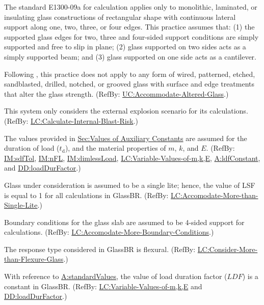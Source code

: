 \documentclass[12pt]{article}
\begin{document}
\begin{description}[font=\normalfont]
\item[glassType:\phantomsection\label{assumpGT}]{The standard E1300-09a for calculation applies only to monolithic, laminated, or insulating glass constructions of rectangular shape with continuous lateral support along one, two, three, or four edges. This practice assumes that: (1) the supported glass edges for two, three and four-sided support conditions are simply supported and free to slip in plane; (2) glass supported on two sides acts as a simply supported beam; and (3) glass supported on one side acts as a cantilever.}
\item[glassCondition:\phantomsection\label{assumpGC}]{Following \cite[(pg. 1)]{astm2009}, this practice does not apply to any form of wired, patterned, etched, sandblasted, drilled, notched, or grooved glass with surface and edge treatments that alter the glass strength. (RefBy: \hyperref[accAlteredGlass]{UC:Accommodate-Altered-Glass}.)}
\item[explainScenario:\phantomsection\label{assumpES}]{This system only considers the external explosion scenario for its calculations. (RefBy: \hyperref[calcInternalBlastRisk]{LC:Calculate-Internal-Blast-Risk}.)}
\item[standardValues:\phantomsection\label{assumpSV}]{The values provided in \hyperref[Sec:AuxConstants]{Sec:Values of Auxiliary Constants} are assumed for the duration of load (${t_{\text{d}}}$), and the material properties of $m$, $k$, and $E$. (RefBy: \hyperref[IM:sdfTol]{IM:sdfTol}, \hyperref[IM:nFL]{IM:nFL}, \hyperref[IM:dimlessLoad]{IM:dimlessLoad}, \hyperref[varValsOfmkE]{LC:Variable-Values-of-m,k,E}, \hyperref[assumpLDFC]{A:ldfConstant}, and \hyperref[DD:loadDurFactor]{DD:loadDurFactor}.)}
\item[glassLite:\phantomsection\label{assumpGL}]{Glass under consideration is assumed to be a single lite; hence, the value of LSF is equal to 1 for all calculations in GlassBR. (RefBy: \hyperref[accMoreThanSingleLite]{LC:Accomodate-More-than-Single-Lite}.)}
\item[boundaryConditions:\phantomsection\label{assumpBC}]{Boundary conditions for the glass slab are assumed to be 4-sided support for calculations. (RefBy: \hyperref[accMoreBoundaryConditions]{LC:Accomodate-More-Boundary-Conditions}.)}
\item[responseType:\phantomsection\label{assumpRT}]{The response type considered in GlassBR is flexural. (RefBy: \hyperref[considerMoreThanFlexGlass]{LC:Consider-More-than-Flexure-Glass}.)}
\item[ldfConstant:\phantomsection\label{assumpLDFC}]{With reference to \hyperref[assumpSV]{A:standardValues}, the value of load duration factor ($\mathit{LDF}$) is a constant in GlassBR. (RefBy: \hyperref[varValsOfmkE]{LC:Variable-Values-of-m,k,E} and \hyperref[DD:loadDurFactor]{DD:loadDurFactor}.)}
\end{description}
\end{document}
